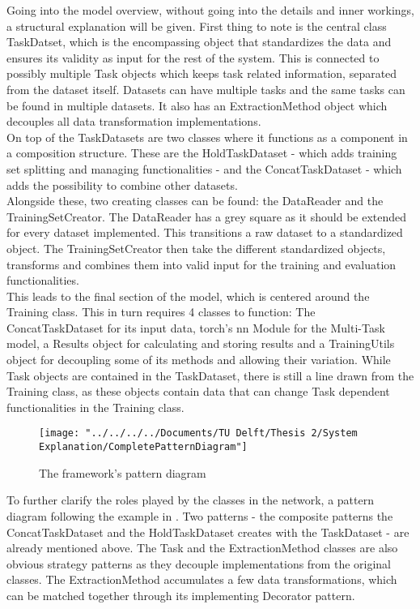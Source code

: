 Going into the model overview, without going into the details and inner workings, a structural explanation will be given. First thing to note is the central class TaskDatset, which is the encompassing object that standardizes the data and ensures its validity as input for the rest of the system. This is connected to possibly multiple Task objects which keeps task related information, separated from the dataset itself. Datasets can have multiple tasks and the same tasks can be found in multiple datasets. It also has an ExtractionMethod object which decouples all data transformation implementations. \\

On top of the TaskDatasets are two classes where it functions as a component in a composition structure. These are the HoldTaskDataset - which adds training set splitting and managing functionalities - and the ConcatTaskDataset - which adds the possibility to combine other datasets.\\

Alongside these, two creating classes can be found: the DataReader and the TrainingSetCreator. The DataReader has a grey square as it should be extended for every dataset implemented. This transitions a raw dataset to a standardized object. The TrainingSetCreator then take the different standardized objects, transforms and combines them into valid input for the training and evaluation functionalities.\\
 
This leads to the final section of the model, which is centered around the Training class. This in turn requires 4 classes to function: The ConcatTaskDataset for its input data, torch's nn Module for the Multi-Task model, a Results object for calculating and storing results and a TrainingUtils object for decoupling some of its methods and allowing their variation. While Task objects are contained in the TaskDataset, there is still a line drawn from the Training class, as these objects contain data that can change Task dependent functionalities in the Training class.\\

\begin{figure}
	\centering
	\texttt{[image: "../../../../Documents/TU Delft/Thesis 2/System Explanation/CompletePatternDiagram"]}
	\caption{The framework's pattern diagram}
	\label{fig:completepatterndiagram}
\end{figure}

To further clarify the roles played by the classes in the network, a pattern diagram following the example in \citet{bouassida2001uml}. Two patterns - the composite patterns the ConcatTaskDataset and the HoldTaskDataset creates with the TaskDataset - are already mentioned above. The Task and the ExtractionMethod classes are also obvious strategy patterns as they decouple implementations from the original classes. The ExtractionMethod accumulates a few data transformations, which can be matched together through its implementing Decorator pattern. \\

